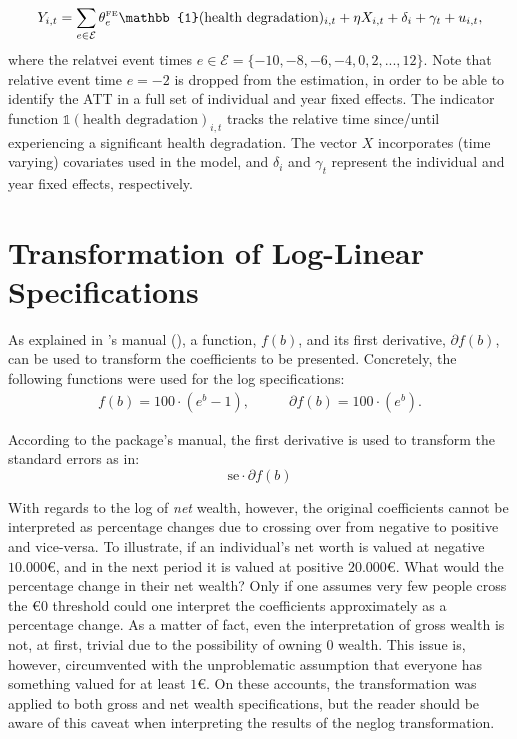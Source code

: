 \begin{equation}
    Y_{i,t}=\sum_{e \in \mathcal{E}} \theta_e^{\text{\tiny{FE}}}   \mathbb{1}(\text {health degradation})_{i,t}+ \eta  X_{i,t} + \delta_i + \gamma_t + u_{i,t},
    \label{eq:twfe}
\end{equation}
where the relatvei event times $e \in \mathcal{E} = \{-10, -8, -6, -4, 0, 2, ..., 12\}$. Note that
relative event time $e=-2$ is dropped from the estimation, in order to be able to identify the ATT
in a full set of individual and year fixed effects. The indicator function $\mathbb{1}(\text {health
    degradation})_{i,t}$ tracks the relative time since/until experiencing a significant health
degradation. The vector $X$ incorporates (time varying) covariates used in the model, and $\delta_i$
and $\gamma_t$ represent the individual and year fixed effects, respectively.


\newpage

\section{Transformation of Log-Linear Specifications}
\label{sec:transformcoefs}

As explained in 's manual (\cite{jann2007making}),
a function, $f(b)$, and its first derivative, $\partial f(b)$, can be used to transform the coefficients to
be presented. Concretely, the following functions were used for the log specifications:  
%
\begin{equation}
    \begin{aligned}
        f(b) = 100 \cdot (e^{b}-1), 
    \end{aligned}\qquad
    \begin{aligned}
        \partial f(b) = 100 \cdot (e^{b}).
    \end{aligned}
    \label{eq:transformcoefs}
\end{equation}

According to the package's manual, the first derivative is used to transform the standard errors as in:
\begin{equation}
        \text{se} \cdot \partial f(b)
\end{equation}

With regards to the log of \textit{net} wealth, however, the original coefficients cannot be interpreted as
percentage changes due to crossing over from negative to positive and vice-versa. To illustrate, if an
individual's net worth is valued at negative $10.000$€, and in the next period it is valued at positive
$20.000$€. What would the percentage change in their net wealth? Only if one assumes very few people cross the
€0 threshold could one interpret the coefficients approximately as a percentage change. As a matter of fact,
even the interpretation of gross wealth is not, at first, trivial due to the possibility of owning 0 wealth.
This issue is, however, circumvented with the unproblematic assumption that everyone has something valued for
at least $1$€. On these accounts, the transformation was applied to both gross and net wealth specifications,
but the reader should be aware of this caveat when interpreting the results of the neglog transformation.

